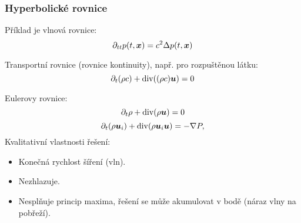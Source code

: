 \subsubsection{Hyperbolické rovnice}

Příklad je vlnová rovnice:
\[
    \partial_{tt} p(t, \mathbf{\boldsymbol{x}}) = c^2 \Delta p(t, \mathbf{\boldsymbol{x}})
\]

Transportní rovnice (rovnice kontinuity), např. pro rozpuštěnou látku:
\[
    \partial_t (\rho c) + \operatorname{div}( (\rho c) \mathbf{\boldsymbol{u}})=0
\]

Eulerovy rovnice:
\[
    \partial_t \rho + \operatorname{div}( \rho \mathbf{\boldsymbol{u}})=0
\]
\[
    \partial_t (\rho \mathbf{\boldsymbol{u}}_i) +\operatorname{div}(\rho \mathbf{\boldsymbol{u}}_i \mathbf{\boldsymbol{u}}) = - \nabla P,
\]
Kvalitativní vlastnosti řešení:
\begin{itemize}
 \item Konečná rychlost šíření (vln).
 \item Nezhlazuje.  
 \item Nesplňuje princip maxima, řešení se může akumulovat v bodě (náraz vlny na pobřeží).
\end{itemize}


